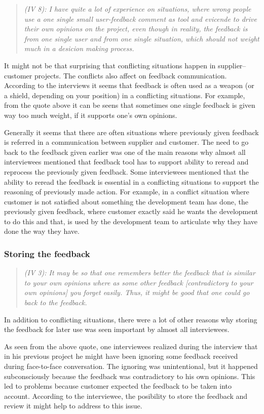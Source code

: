 \documentclass[english,12pt,a4paper,pdftex]{article}
\newcommand{\q}[2]{
\begin{quote}
\emph{(IV #1): #2}
\end{quote}}
\begin{document}
\q{8}{I have quite a lot of experience on situations, where wrong people use a one single small user-feedback comment as tool and evicende to drive their own opinions on the project, even though in reality, the feedback is from one single user and from one single situation, which should not weight much in a desicion making process.}

It might not be that surprising that conflicting situations happen in supplier--customer projects. The conflicts also affect on feedback communication. According to the interviews it seems that feedback is often used as a weapon (or a shield, depending on your position) in a conflicting situations. For example, from the quote above it can be seens that sometimes one single feedback is given way too much weight, if it supports one's own opinions.

Generally it seems that there are often situations where previously given feedback is referred in a communication between supplier and customer. The need to go back to the feedback given earlier was one of the main reasons why almost all interviewees mentioned that feedback tool has to support ability to reread and reprocess the previously given feedback. Some interviewees mentioned that the ability to reread the feedback is essential in a conflicting situations to support the reasoning of previously made action. For example, in a conflict situation where customer is not satisfied about something the development team has done, the previously given feedback, where customer exactly said he wants the development to do this and that, is used by the development team to articulate why they have done the way they have.

\subsubsection{Storing the feedback}

\q{3}{It may be so that one remembers better the feedback that is similar to your own opinions where as some other feedback [contradictory to your own opinions] you forget easily. Thus, it might be good that one could go back to the feedback.}

In addition to conflicting situations, there were a lot of other reasons why storing the feedback for later use was seen important by almost all interviewees.

As seen from the above quote, one interviewees realized during the interview that in his previous project he might have been ignoring some feedback received during face-to-face conversation. The ignoring was unintentional, but it happened subconsciously because the feedback was contradictory to his own opinions. This led to problems because customer expected the feedback to be taken into account. According to the interviewee, the posibility to store the feedback and review it might help to address to this issue.
\end{document}
